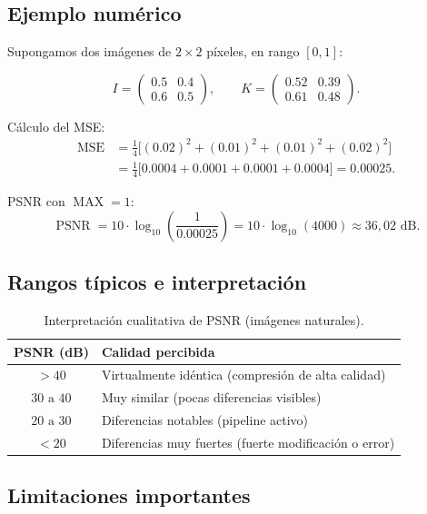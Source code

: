 \documentclass[11pt,a4paper]{article}
\begin{document}
\subsection{Ejemplo numérico}

Supongamos dos imágenes de \(2 \times 2\) píxeles, en rango \([0,1]\):

\[
I = \begin{pmatrix} 0.5 & 0.4 \\ 0.6 & 0.5 \end{pmatrix}, \qquad
K = \begin{pmatrix} 0.52 & 0.39 \\ 0.61 & 0.48 \end{pmatrix}.
\]

Cálculo del MSE:
\begin{align*}
\operatorname{MSE} &= \frac{1}{4}\bigl[(0.02)^2 + (0.01)^2 + (0.01)^2 + (0.02)^2\bigr] \\
                   &= \frac{1}{4}\bigl[0.0004 + 0.0001 + 0.0001 + 0.0004\bigr] = 0.00025.
\end{align*}

PSNR con \(\operatorname{MAX} = 1\):
\[
\operatorname{PSNR} = 10 \cdot \log_{10}\!\left(\frac{1}{0.00025}\right) = 10 \cdot \log_{10}(4000) \approx 36{,}02 \text{ dB}.
\]

\subsection{Rangos típicos e interpretación}

\begin{table}[H]
\centering
\caption{Interpretación cualitativa de PSNR (imágenes naturales).}
\begin{tabular}{@{}cl@{}}
\toprule
PSNR (dB) & Calidad percibida \\
\midrule
\(> 40\)      & Virtualmente idéntica (compresión de alta calidad) \\
\(30 \text{ a } 40\) & Muy similar (pocas diferencias visibles) \\
\(20 \text{ a } 30\) & Diferencias notables (pipeline activo) \\
\(< 20\)      & Diferencias muy fuertes (fuerte modificación o error) \\
\bottomrule
\end{tabular}
\end{table}

\subsection{Limitaciones importantes}
\end{document}
